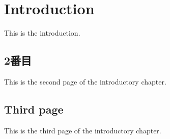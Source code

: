 \chapter{Introduction}
This is the introduction. 
\newpage
\section{2番目}
This is the second page of the introductory chapter. 
\newpage
\section{Third page}
This is the third page of the introductory chapter.
